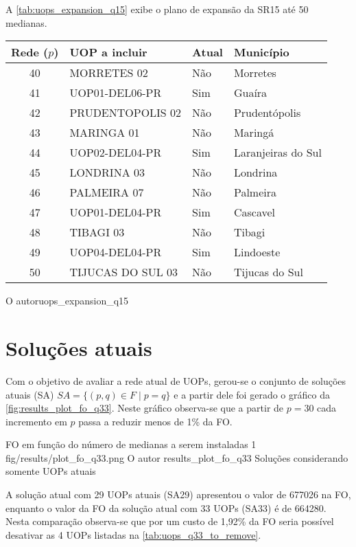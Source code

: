 A \autoref{tab:uops_expansion_q15} exibe o plano de expansão da SR15 até 50 medianas.

{\begin{tabular}{c|l|l|l}\hline
 Rede ($p$) & UOP a incluir & Atual & Município \\ \hline\hline
 40 &       MORRETES 02 &   Não &           Morretes \\
  41 &    UOP01-DEL06-PR &   Sim &             Guaíra \\
  42 &  PRUDENTOPOLIS 02 &   Não &      Prudentópolis \\
  43 &        MARINGA 01 &   Não &            Maringá \\
  44 &    UOP02-DEL04-PR &   Sim & Laranjeiras do Sul \\
  45 &       LONDRINA 03 &   Não &           Londrina \\
  46 &       PALMEIRA 07 &   Não &           Palmeira \\
  47 &    UOP01-DEL04-PR &   Sim &           Cascavel \\
  48 &         TIBAGI 03 &   Não &             Tibagi \\
  49 &    UOP04-DEL04-PR &   Sim &          Lindoeste \\
  50 & TIJUCAS DO SUL 03 &   Não &     Tijucas do Sul \\
 \hline
\end{tabular}}
{O autor}{uops_expansion_q15}{}{}

\section{Soluções atuais}

Com o objetivo de avaliar a rede atual de UOPs, gerou-se o conjunto de soluções atuais (SA) $SA = \{ (p,q) \in F \mid p = q \}$ e a partir dele foi gerado o gráfico da \autoref{fig:results_plot_fo_q33}. Neste gráfico observa-se que a partir de $p = 30$ cada incremento em $p$ passa a reduzir menos de 1\% da FO.


\figurah
{FO em função do número de medianas a serem instaladas}
{1}
{fig/results/plot_fo_q33.png}
{O autor}
{results_plot_fo_q33}
{Soluções considerando somente UOPs atuais}
{}

A solução atual com 29 UOPs atuais (SA29) apresentou o valor de 677026 na FO, enquanto o valor da FO da solução atual com 33 UOPs (SA33) é de 664280. Nesta comparação observa-se que por um custo de 1,92\% da FO seria possível desativar as 4 UOPs listadas na \autoref{tab:uops_q33_to_remove}.

